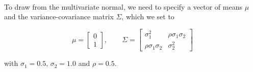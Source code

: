 \documentclass[10pt]{scrartcl}
\begin{document}
    \begin{center}
    \end{center}
    { \hspace*{\fill} \\}
    
    To draw from the multivariate normal, we need to specify a vector of
means \(\mu\) and the variance-covariance matrix \(\Sigma\), which we
set to

\[\mu = \left[\begin{array}{c} 0 \\ 1\end{array}\right], \qquad \Sigma=\left[\begin{array}{cc}\sigma_1^2 & \rho \sigma_1\sigma_2 \\ \rho\sigma_1\sigma_2 & \sigma_2^2\end{array}\right]\]

with \(\sigma_1 = 0.5\), \(\sigma_2 = 1.0\) and \(\rho = 0.5\).
\end{document}
